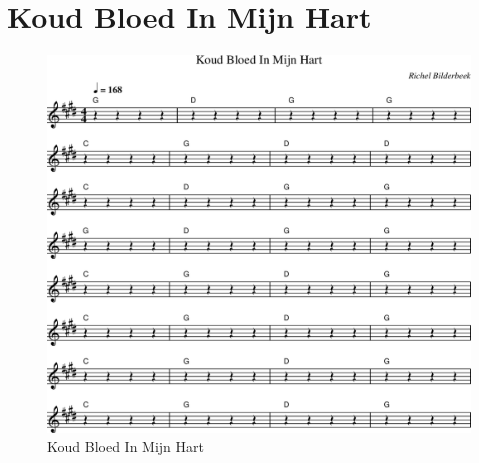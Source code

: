 \chapter{Koud Bloed In Mijn Hart}



\begin{figure}[!htbp]
  \includegraphics[width=\textwidth,height=\textheight,keepaspectratio]{../songs/46_koud_bloed_in_mijn_hart.png}
  \caption{Koud Bloed In Mijn Hart}
  \label{fig:46_koud_bloed_in_mijn_hart}
\end{figure}
